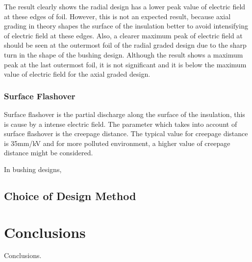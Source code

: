The result clearly shows the radial design has a lower peak value of electric field at these edges of foil. However, this is not an expected result, because axial grading in theory shapes the surface of the insulation better to avoid intensifying of electric field at these edges. Also, a clearer maximum peak of electric field at should be seen at the outermost foil of the radial graded design due to the sharp turn in the shape of the bushing design. Although the result shows a maximum peak at the last outermost foil, it is not significant and it is below the maximum value of electric field for the axial graded design.

\subsubsection{Surface Flashover}
Surface flashover is the partial discharge along the surface of the insulation, this is cause by a intense electric field. The parameter which takes into account of surface flashover is the creepage distance. The typical value for creepage distance is 35mm/kV %
and for more polluted environment, a higher value of creepage distance might be considered.

In bushing designs, 

\subsection{Choice of Design Method}

\section{Conclusions}
Conclusions.